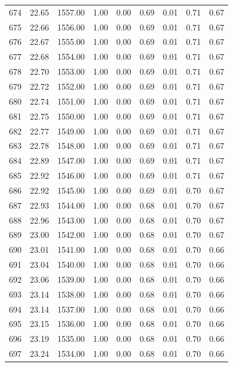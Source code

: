 \documentclass{article}\usepackage[]{graphicx}\usepackage[]{color}
\begin{document}
\begin{longtable}{rrrrrrrrr}
  674 & 22.65 & 1557.00 & 1.00 & 0.00 & 0.69 & 0.01 & 0.71 & 0.67 \\ 
  675 & 22.66 & 1556.00 & 1.00 & 0.00 & 0.69 & 0.01 & 0.71 & 0.67 \\ 
  676 & 22.67 & 1555.00 & 1.00 & 0.00 & 0.69 & 0.01 & 0.71 & 0.67 \\ 
  677 & 22.68 & 1554.00 & 1.00 & 0.00 & 0.69 & 0.01 & 0.71 & 0.67 \\ 
  678 & 22.70 & 1553.00 & 1.00 & 0.00 & 0.69 & 0.01 & 0.71 & 0.67 \\ 
  679 & 22.72 & 1552.00 & 1.00 & 0.00 & 0.69 & 0.01 & 0.71 & 0.67 \\ 
  680 & 22.74 & 1551.00 & 1.00 & 0.00 & 0.69 & 0.01 & 0.71 & 0.67 \\ 
  681 & 22.75 & 1550.00 & 1.00 & 0.00 & 0.69 & 0.01 & 0.71 & 0.67 \\ 
  682 & 22.77 & 1549.00 & 1.00 & 0.00 & 0.69 & 0.01 & 0.71 & 0.67 \\ 
  683 & 22.78 & 1548.00 & 1.00 & 0.00 & 0.69 & 0.01 & 0.71 & 0.67 \\ 
  684 & 22.89 & 1547.00 & 1.00 & 0.00 & 0.69 & 0.01 & 0.71 & 0.67 \\ 
  685 & 22.92 & 1546.00 & 1.00 & 0.00 & 0.69 & 0.01 & 0.71 & 0.67 \\ 
  686 & 22.92 & 1545.00 & 1.00 & 0.00 & 0.69 & 0.01 & 0.70 & 0.67 \\ 
  687 & 22.93 & 1544.00 & 1.00 & 0.00 & 0.68 & 0.01 & 0.70 & 0.67 \\ 
  688 & 22.96 & 1543.00 & 1.00 & 0.00 & 0.68 & 0.01 & 0.70 & 0.67 \\ 
  689 & 23.00 & 1542.00 & 1.00 & 0.00 & 0.68 & 0.01 & 0.70 & 0.67 \\ 
  690 & 23.01 & 1541.00 & 1.00 & 0.00 & 0.68 & 0.01 & 0.70 & 0.66 \\ 
  691 & 23.04 & 1540.00 & 1.00 & 0.00 & 0.68 & 0.01 & 0.70 & 0.66 \\ 
  692 & 23.06 & 1539.00 & 1.00 & 0.00 & 0.68 & 0.01 & 0.70 & 0.66 \\ 
  693 & 23.14 & 1538.00 & 1.00 & 0.00 & 0.68 & 0.01 & 0.70 & 0.66 \\ 
  694 & 23.14 & 1537.00 & 1.00 & 0.00 & 0.68 & 0.01 & 0.70 & 0.66 \\ 
  695 & 23.15 & 1536.00 & 1.00 & 0.00 & 0.68 & 0.01 & 0.70 & 0.66 \\ 
  696 & 23.19 & 1535.00 & 1.00 & 0.00 & 0.68 & 0.01 & 0.70 & 0.66 \\ 
  697 & 23.24 & 1534.00 & 1.00 & 0.00 & 0.68 & 0.01 & 0.70 & 0.66 \\ 

\end{longtable}
\end{document}

